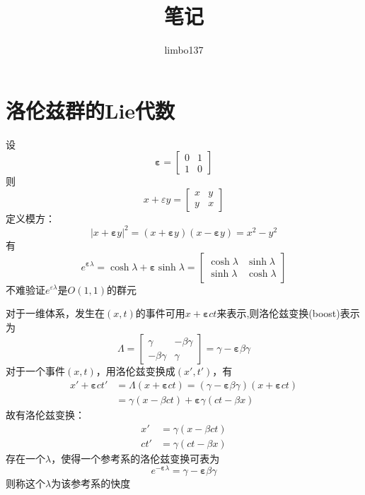 \documentclass[hyperref,utf8]{ctexart}
\title{笔记}
\author{limbo137}
\date{}
\newcommand{\e}{\boldsymbol{\varepsilon}}
\begin{document}
\maketitle
\section{洛伦兹群的Lie代数}
设
\[{\boldsymbol{\varepsilon}}= 
\begin{bmatrix}
0 & 1 \\ 1 & 0
\end{bmatrix} \]
则
\[x+\varepsilon y=
\begin{bmatrix}
x & y \\ y & x
\end{bmatrix} \]
定义模方：
\[|x+{\boldsymbol{\varepsilon}} y|^2=(x+{\e } y)(x-{\boldsymbol{\varepsilon}} y)=x^2-y^2\]
有
\[e^{{\boldsymbol{\varepsilon}}\lambda}=\cosh{\lambda}+{\boldsymbol{\varepsilon}}\sinh{\lambda}=\begin{bmatrix}
\cosh{\lambda} & \sinh{\lambda} \\ \sinh{\lambda} & \cosh{\lambda}
\end{bmatrix} \]
不难验证$e^{\varepsilon\lambda}$是$O(1,1)$的群元

对于一维体系，发生在$(x,t)$的事件可用$x+{\boldsymbol{\varepsilon}} ct$来表示,则洛伦兹变换(boost)表示为
\[\Lambda=\begin{bmatrix}
\gamma & -\beta\gamma \\ -\beta\gamma & \gamma
\end{bmatrix}=\gamma-{\boldsymbol{\varepsilon}}\beta\gamma\]
对于一个事件$(x,t)$，用洛伦兹变换成$(x',t')$，有
\begin{equation*}
    \begin{split}
        x'+{\boldsymbol{\varepsilon}} ct'
        &=\Lambda(x+{\boldsymbol{\varepsilon}}ct)=(\gamma-{\boldsymbol{\varepsilon}}\beta\gamma)(x+{\boldsymbol{\varepsilon}} ct)\\&=\gamma(x-\beta ct)+{\boldsymbol{\varepsilon}}\gamma(ct-\beta x)
    \end{split}
\end{equation*}
故有洛伦兹变换：
\begin{equation*}
    \begin{split}
    x'&=\gamma(x-\beta ct)\\
    ct'&=\gamma(ct-\beta x)
    \end{split}
\end{equation*}
存在一个$\lambda$，使得一个参考系的洛伦兹变换可表为
\[e^{{-\boldsymbol{\varepsilon}}\lambda}=\gamma-{\boldsymbol{\varepsilon}}\beta\gamma\]
则称这个$\lambda$为该参考系的快度
\end{document}
